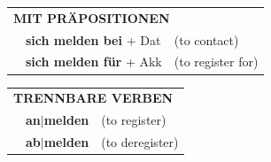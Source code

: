 \documentclass[10pt,a4paper]{revtex4-2}
\begin{document}
\begin{verbbox}
\vspace{10pt}

\begin{tabular}{lll}
\multicolumn{3}{l}{\textbf{MIT PRÄPOSITIONEN}}\\
& \textbf{sich melden bei} + Dat & (to contact)\\
& \textbf{sich melden für} + Akk & (to register for)\\
\end{tabular}
\hfill
\begin{tabular}{lll}
\multicolumn{3}{l}{\textbf{TRENNBARE VERBEN}}\\
& \textbf{an$|$melden} & (to register)\\
& \textbf{ab$|$melden} & (to deregister)\\
\end{tabular}
\vspace{-5pt}
\end{verbbox}
\end{document}
